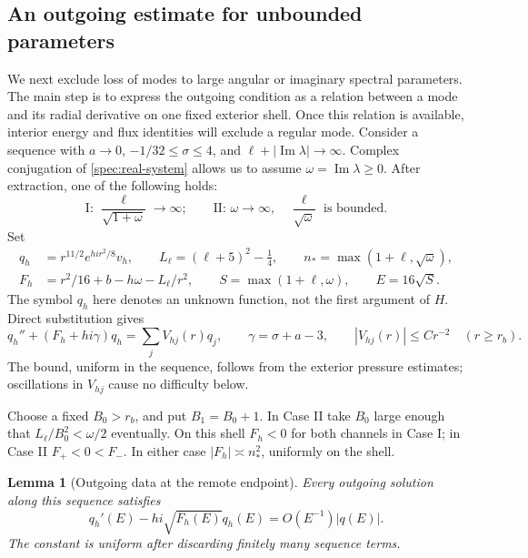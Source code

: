 \documentclass[11pt]{article}
\numberwithin{equation}{section}
\newtheorem{lemma}[theorem]{Lemma}
\theoremstyle{definition}
\theoremstyle{remark}
\begin{document}
\subsection{An outgoing estimate for unbounded parameters}

We next exclude loss of modes to large angular or imaginary spectral
parameters. The main step is to express the outgoing condition as a relation
between a mode and its radial derivative on one fixed exterior shell.
Once this relation is available, interior energy and flux identities will
exclude a regular mode. Consider a sequence with $a\to0$,
$-1/32\le\sigma\le4$, and
$\ell+|\operatorname{Im}\lambda|\to\infty$. Complex conjugation of
\eqref{spec:real-system} allows us to assume
$\omega=\operatorname{Im}\lambda\ge0$. After extraction, one of the
following holds:
\begin{equation}\label{spec:cases}
 \text{I: }\frac{\ell}{\sqrt{1+\omega}}\longrightarrow\infty;
 \qquad
 \text{II: }\omega\longrightarrow\infty,\quad
 \frac{\ell}{\sqrt\omega}\text{ is bounded}.
\end{equation}
Set
\begin{equation}\label{spec:high-definitions}
 \begin{split}
 q_h&=r^{11/2}e^{hi r^2/8}v_h,\qquad
 L_\ell=(\ell+5)^2-\tfrac14,\qquad n_* =\max(1+\ell,\sqrt\omega),\\
 F_h&=r^2/16+b-h\omega-L_\ell/r^2,
 \qquad S=\max(1+\ell,\omega),\qquad E=16\sqrt S.
 \end{split}
\end{equation}
The symbol $q_h$ here denotes an unknown function, not the first
argument of $H$. Direct substitution gives
\begin{equation}\label{spec:schrodinger-radial}
 q_h''+(F_h+hi\gamma)q_h=\sum_j V_{hj}(r)q_j,
 \qquad \gamma=\sigma+a-3,\qquad |V_{hj}(r)|\le Cr^{-2}
 \quad(r\ge r_b).
\end{equation}
The bound, uniform in the sequence, follows from the exterior pressure
estimates; oscillations in $V_{hj}$ cause no difficulty below.

Choose a fixed $B_0>r_b$, and put $B_1=B_0+1$. In Case II take $B_0$
large enough that $L_\ell/B_0^2<\omega/2$ eventually. On this shell
$F_h<0$ for both channels in Case I; in Case II $F_+<0<F_-$.
In either case $|F_h|\asymp n_*^2$, uniformly on the shell.

\begin{lemma}[Outgoing data at the remote endpoint]\label{spec:remote-data}
Every outgoing solution along this sequence satisfies
\begin{equation}\label{spec:remote-robin}
 q_h'(E)-hi\sqrt{F_h(E)}q_h(E)=O(E^{-1})|q(E)|.
\end{equation}
The constant is uniform after discarding finitely many sequence terms.
\end{lemma}
\end{document}
